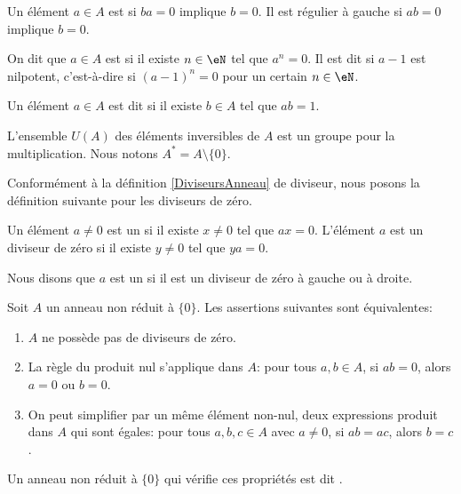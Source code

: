 Un élément \( a\in A\) est  si \( ba=0\) implique \( b=0\). Il est régulier à gauche si \( ab=0\) implique \( b=0\).

\begin{definition}  \label{DEFooHRRYooTmbUTH}
	On dit que \( a \in A \) est  si il existe \( n \in \eN \) tel que \( a^n = 0 \). Il est dit  si \( a-1\) est nilpotent, c'est-à-dire si \( (a-1)^n =0\) pour un certain \( n \in \eN \).
\end{definition}

\begin{definition}        \label{DEFooCIHVooAhpJxy}
	Un élément \( a \in A \) est dit  si il existe \( b \in A \) tel que \( ab = 1 \).

L'ensemble \( U(A)\) des éléments inversibles de \( A\) est un groupe pour la multiplication. Nous notons \( A^*=A\setminus\{ 0 \}\).
\end{definition}

Conformément à la définition \ref{DiviseursAnneau} de diviseur, nous posons la définition suivante pour les diviseurs de zéro.
\begin{definition}
    Un élément \( a\neq 0\) est un  si il existe \( x\neq 0\) tel que $ax=0$. L'élément \( a\) est un diviseur de zéro  si il existe \( y\neq 0\) tel que \( ya=0\).

    Nous disons que \( a\) est un  si il est un diviseur de zéro à gauche ou à droite.
\end{definition}

\begin{propositionDef}           \label{DEFooTAOPooWDPYmd}
    Soit $A$ un anneau non réduit à \( \{ 0 \}\). Les assertions suivantes sont équivalentes:
    \begin{enumerate}
        \item       \label{ITEMooMXMKooXMYpkN}
            \( A\) ne possède pas de diviseurs de zéro.
        \item       \label{ITEMooLAJCooFwxXrV}
            La règle du produit nul s'applique dans $A$: pour tous \( a, b \in A \), si \( ab=0\), alors \( a = 0\) ou \( b = 0\).
        \item       \label{ITEMooQNTFooSRrVPK}
            On peut simplifier par un même élément non-nul, deux expressions produit dans $A$ qui sont égales: pour tous \( a, b, c \in A \) avec \( a \neq 0 \), si \( ab = ac \), alors \( b = c \).
    \end{enumerate}
    Un anneau non réduit à \( \{ 0 \}\) qui vérifie ces propriétés est dit .
\end{propositionDef}

